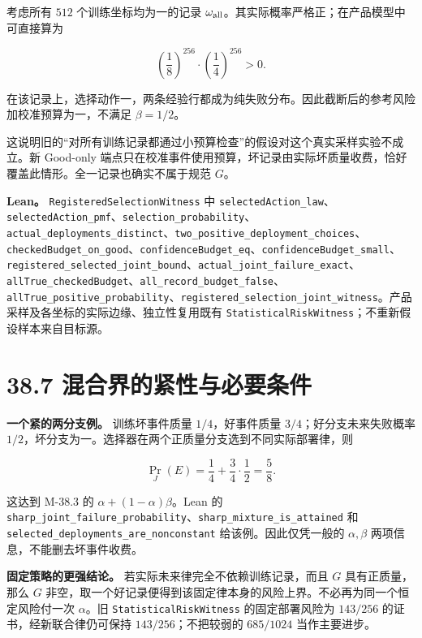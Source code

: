 \documentclass[
  11pt,
  oneside]{book}
\begin{document}
考虑所有 \(512\) 个训练坐标均为一的记录 \(\omega_{\rm all}\)。其实际概率严格正；在产品模型中可直接算为

\[\left(\frac18\right)^{256}\cdot
\left(\frac14\right)^{256}>0.\]

在该记录上，选择动作一，两条经验行都成为纯失败分布。因此截断后的参考风险加校准预算为一，不满足 \(\beta=1/2\)。

这说明旧的``对所有训练记录都通过小预算检查''的假设对这个真实采样实验不成立。新 Good-only 端点只在校准事件使用预算，坏记录由实际坏质量收费，恰好覆盖此情形。全一记录也确实不属于规范 \(G\)。

\textbf{Lean。} \nolinkurl{RegisteredSelectionWitness} 中 \nolinkurl{selectedAction_law}、\nolinkurl{selectedAction_pmf}、\nolinkurl{selection_probability}、\nolinkurl{actual_deployments_distinct}、\nolinkurl{two_positive_deployment_choices}、\nolinkurl{checkedBudget_on_good}、\nolinkurl{confidenceBudget_eq}、\nolinkurl{confidenceBudget_small}、\nolinkurl{registered_selected_joint_bound}、\nolinkurl{actual_joint_failure_exact}、\nolinkurl{allTrue_checkedBudget}、\nolinkurl{all_record_budget_false}、\nolinkurl{allTrue_positive_probability}、\nolinkurl{registered_selection_joint_witness}。产品采样及各坐标的实际边缘、独立性复用既有 \nolinkurl{StatisticalRiskWitness}；不重新假设样本来自目标源。

\section{38.7 混合界的紧性与必要条件}\label{ux6df7ux5408ux754cux7684ux7d27ux6027ux4e0eux5fc5ux8981ux6761ux4ef6}

\textbf{一个紧的两分支例。} 训练坏事件质量 \(1/4\)，好事件质量 \(3/4\)；好分支未来失败概率 \(1/2\)，坏分支为一。选择器在两个正质量分支选到不同实际部署律，则

\[\Pr_J(E)=\frac14+\frac34\cdot\frac12=\frac58.\]

这达到 M-38.3 的 \(\alpha+(1-\alpha)\beta\)。Lean 的 \nolinkurl{sharp_joint_failure_probability}、\nolinkurl{sharp_mixture_is_attained} 和 \nolinkurl{selected_deployments_are_nonconstant} 给该例。因此仅凭一般的 \(\alpha,\beta\) 两项信息，不能删去坏事件收费。

\textbf{固定策略的更强结论。} 若实际未来律完全不依赖训练记录，而且 \(G\) 具有正质量，那么 \(G\) 非空，取一个好记录便得到该固定律本身的风险上界。不必再为同一个恒定风险付一次 \(\alpha\)。旧 \nolinkurl{StatisticalRiskWitness} 的固定部署风险为 \(143/256\) 的证书，经新联合律仍可保持 \(143/256\)；不把较弱的 \(685/1024\) 当作主要进步。
\end{document}
